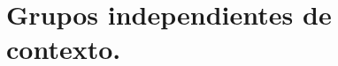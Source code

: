 \documentclass[tesis.tex]{subfiles}
\begin{document}
\section{Grupos independientes de contexto.}
% 

%
%		
%		
%		
%		
%		
%	
		
\end{document}
